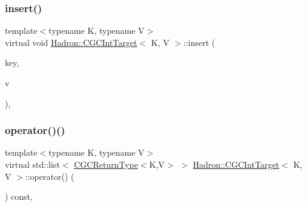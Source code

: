 \mbox{\label{classHadron_1_1CGCIntTarget_a2c1e2eaf068abdc394ba3326c7770e77}} 
\subsubsection{\texorpdfstring{insert()}{insert()}\hspace{0.1cm}{\footnotesize\ttfamily [3/3]}}
{\footnotesize\ttfamily template$<$typename K, typename V$>$ \\
virtual void \mbox{\hyperlink{classHadron_1_1CGCIntTarget}{Hadron\+::\+C\+G\+C\+Int\+Target}}$<$ K, V $>$\+::insert (\begin{DoxyParamCaption}\item[{const \mbox{\hyperlink{structHadron_1_1CGCKeyType}{C\+G\+C\+Key\+Type}}$<$ K $>$ \&}]{key,  }\item[{const V \&}]{v }\end{DoxyParamCaption})\hspace{0.3cm}{\ttfamily [inline]}, {\ttfamily [virtual]}}

\mbox{\label{classHadron_1_1CGCIntTarget_ae6c0ce90fe1f8a2880984df1e2e44c18}} 
\subsubsection{\texorpdfstring{operator()()}{operator()()}\hspace{0.1cm}{\footnotesize\ttfamily [1/6]}}
{\footnotesize\ttfamily template$<$typename K, typename V$>$ \\
virtual std\+::list$<$ \mbox{\hyperlink{structHadron_1_1CGCReturnType}{C\+G\+C\+Return\+Type}}$<$K,V$>$ $>$ \mbox{\hyperlink{classHadron_1_1CGCIntTarget}{Hadron\+::\+C\+G\+C\+Int\+Target}}$<$ K, V $>$\+::operator() (\begin{DoxyParamCaption}\item[{void}]{ }\end{DoxyParamCaption}) const\hspace{0.3cm}{\ttfamily [inline]}, {\ttfamily [virtual]}}



